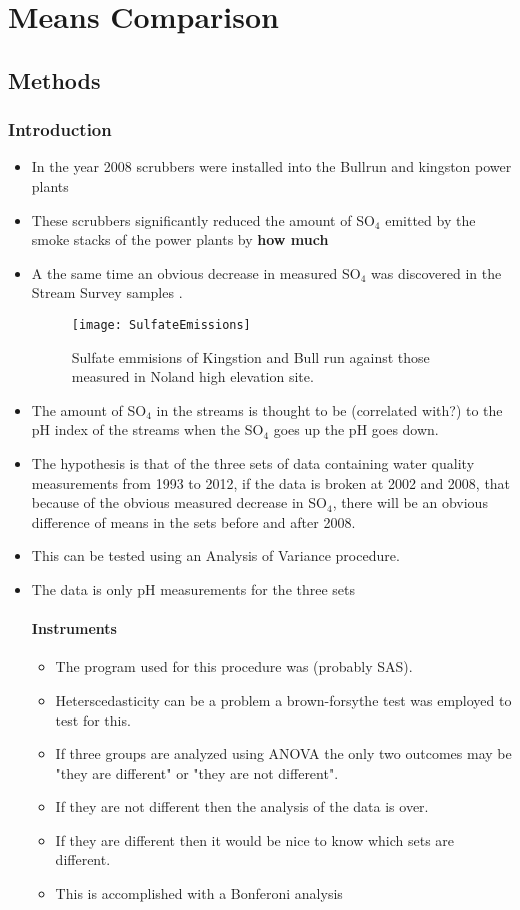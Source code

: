 \chapter{Means Comparison}\label{ch:mc}
\section{Methods}
\subsection{Introduction}
\begin{itemize}
    \item In the year 2008 scrubbers were installed into the Bullrun and kingston power plants
    \item These scrubbers significantly reduced the amount of SO$_4$ emitted by the smoke stacks of the power plants by {\bf how much}
    \item A the same time an obvious decrease in measured SO$_4$ was discovered in the Stream Survey samples \citep{annualreport2012}.
   \begin{figure}[h!]
  \centering
  \texttt{[image: SulfateEmissions]}\\
  \caption{Sulfate emmisions of Kingstion and Bull run against those measured in Noland high elevation site.}\label{fig:sulfateemissions}
\end{figure}
    \item The amount of SO$_4$ in the streams is thought to be (correlated with?) to the pH index of the streams when the SO$_4$ goes up the pH goes down.
    \item The hypothesis is that of the three sets of data containing water quality measurements from 1993 to 2012, if the data is broken at 2002 and 2008, that
    because of the obvious measured decrease in SO$_4$, there will be an obvious difference of means in the sets before and after 2008.
    \item This can be tested using an Analysis of Variance procedure.
    \item The data is only pH measurements for the three sets
    \subsubsection{Instruments}
    \begin{itemize}
        \item The program used for this procedure was (probably SAS).
        \item Heterscedasticity can be a problem a brown-forsythe test was employed to test for this.
        \item If three groups are analyzed using ANOVA the only two outcomes may be "they are different" or "they are not different".
        \item If they are not different then the analysis of the data is over.
        \item If they are different then it would be nice to know which sets are different.
        \item This is accomplished with a Bonferoni analysis %
    \end{itemize}
\end{itemize}
